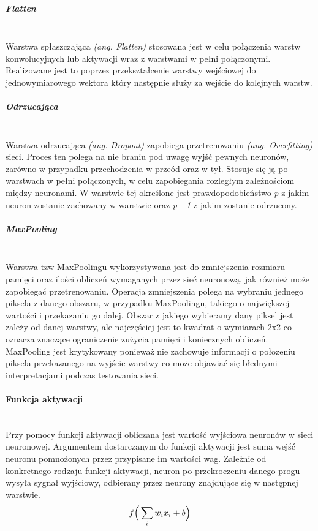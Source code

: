 \subparagraph{Flatten}  \mbox{}\\
Warstwa spłaszczająca \textit{(ang. Flatten)} stosowana jest w celu połączenia warstw
konwolucyjnych lub aktywacji wraz z warstwami w pełni połączonymi. Realizowane jest
to poprzez przekształcenie warstwy wejściowej do jednowymiarowego wektora który następnie
służy za wejście do kolejnych warstw.

\subparagraph{Odrzucająca}  \mbox{}\\
Warstwa odrzucająca \textit{(ang. Dropout)} zapobiega przetrenowaniu \textit{(ang. Overfitting)}
sieci. Proces ten polega na nie braniu pod uwagę wyjść pewnych neuronów, zarówno
w przypadku przechodzenia w przeód oraz w tył. Stosuje się ją po warstwach w pełni
połączonych, w celu zapobiegania rozległym zależnościom między neuronami. W warstwie
tej określone jest prawdopodobieństwo \textit{p} z jakim neuron zostanie zachowany
w warstwie oraz \textit{p - 1} z jakim zostanie odrzucony.


\subparagraph{MaxPooling}  \mbox{}\\
Warstwa tzw MaxPoolingu wykorzystywana jest do zmniejszenia rozmiaru pamięci oraz
ilości obliczeń wymaganych przez sieć neuronową, jak również może zapobiegać przetrenowaniu.
Operacja zmniejszenia polega na wybraniu jednego piksela z danego obszaru, w przypadku
MaxPoolingu, takiego o największej wartości i przekazaniu go dalej. Obszar z jakiego
wybieramy dany piksel jest zależy od danej warstwy, ale najczęściej jest to kwadrat
o wymiarach 2x2 co oznacza znaczące ograniczenie zużycia pamięci i koniecznych obliczeń.
MaxPooling jest krytykowany ponieważ nie zachowuje informacji o połozeniu piksela
przekazanego na wyjście warstwy co może objawiać się błednymi interpretacjami
podczas testowania sieci.



\paragraph{Funkcja aktywacji} \mbox{}\\
Przy pomocy funkcji aktywacji obliczana jest wartość wyjściowa neuronów w sieci
neuronowej. Argumentem dostarczanym do funkcji aktywacji jest suma wejść neuronu
pomnożonych przez przypisane im wartości wag. Zależnie od konkretnego rodzaju funkcji
aktywacji, neuron po przekroczeniu danego progu wysyła sygnał wyjściowy, odbierany
przez neurony znajdujące się w następnej warstwie.
\begin{equation}
f\Big(\sum_{i}w_{i}x_{i} + b\Big) \\
\end{equation}

